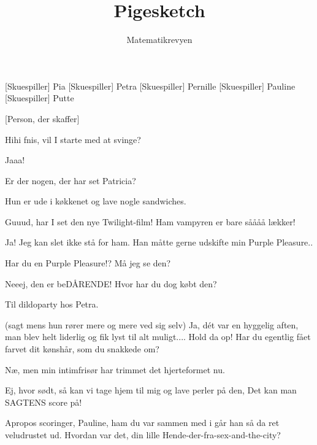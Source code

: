 \documentclass[a4paper,11pt]{article}
\title{Pigesketch}
\author{Matematikrevyen}
\begin{document}
\maketitle

\begin{roles}
[Skuespiller] Pia
[Skuespiller] Petra
[Skuespiller] Pernille
[Skuespiller] Pauline
[Skuespiller] Putte
\end{roles}

\begin{props}
[Person, der skaffer]
\end{props}

\begin{sketch}

 Hihi fnis, vil I starte med at svinge?

 Jaaa!

 Er der nogen, der har set Patricia?

 Hun er ude i køkkenet og lave nogle sandwiches.


 Guuud, har I set den nye Twilight-film! Ham vampyren er bare såååå lækker!

 Ja! Jeg kan slet ikke stå for ham. Han måtte gerne udskifte min Purple Pleasure..

 Har du en Purple Pleasure!? Må jeg se den?


 Neeej, den er beDÅRENDE! Hvor har du dog købt den?

 Til dildoparty hos Petra.

 (sagt mens hun rører mere og mere ved sig selv) Ja, dét var en hyggelig aften, man blev helt liderlig og fik lyst til alt muligt.... Hold da op! Har du egentlig fået farvet dit kønshår, som du snakkede om?

 Næ, men min intimfrisør har trimmet det hjerteformet nu.

 Ej, hvor sødt, så kan vi tage hjem til mig og lave perler på den, Det kan man SAGTENS score på!

 Apropos scoringer, Pauline, ham du var sammen med i går han så da ret veludrustet ud. Hvordan var det, din lille Hende-der-fra-sex-and-the-city?


\end{sketch}
\end{document}
